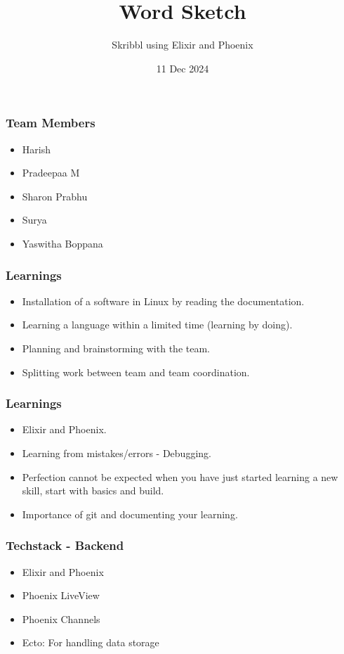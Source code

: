 \documentclass{beamer}
\title{Word Sketch}
\subtitle{Skribbl using Elixir and Phoenix}
\date{11 Dec 2024}
\begin{document}
\begin{frame}
    \titlepage
\end{frame}


\begin{frame}
    \frametitle{Team Members}
    \begin{itemize}
        \item Harish
        \item Pradeepaa M
        \item Sharon Prabhu
        \item Surya
        \item Yaswitha Boppana
    \end{itemize}
\end{frame}


\begin{frame}
    \frametitle{Learnings}
    \begin{itemize}
    \item Installation of a software in Linux by reading the documentation.
    \vspace{1 mm}
    \item Learning a language within a limited time (learning by doing).
    \vspace{1 mm}
    \item Planning and brainstorming with the team.
    \vspace{1 mm}
    \item Splitting work between team and team coordination.
    \end{itemize}
\end{frame}

\begin{frame}
    \frametitle{Learnings}
    \begin{itemize}
        \item Elixir and Phoenix.
        \vspace{1 mm}
        \item Learning from mistakes/errors - Debugging.
        \vspace{1 mm}
        \item Perfection cannot be expected when you have just started learning a new skill, start with basics and build.
        \vspace{1 mm}
        \item Importance of git and documenting your learning.
    \end{itemize}
\end{frame}

\begin{frame}
    \frametitle{Techstack - Backend}
    \begin{itemize}
        \item Elixir and Phoenix
        \vspace{1 mm}
        \item Phoenix LiveView
        \vspace{1 mm}
        \item Phoenix Channels
        \vspace{1 mm}
        \item Ecto: For handling data storage
    \end{itemize}
\end{frame}
\end{document}
